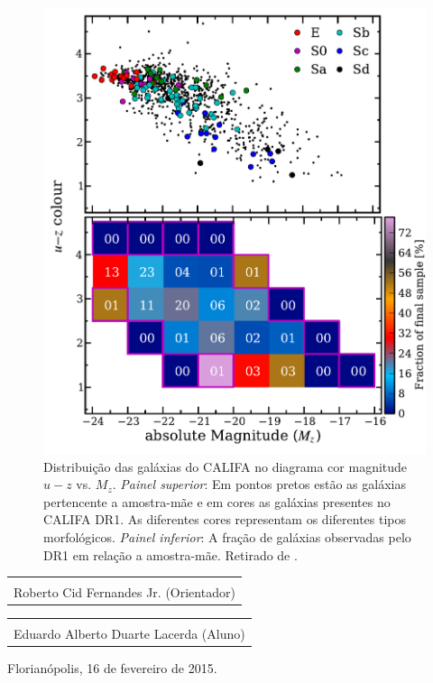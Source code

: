 \documentclass[a4paper,12pt]{article}
\makeatletter
\newcommand{\signature}[2][2.5in]{%
  \noindent%
  \begin{center}
  \begin{tabular}{@{}p{#1}@{}}
    \\ \hline \\ [-.75\normalbaselineskip]
    #2
  \end{tabular} 
  \end{center}
}
\makeatother
\begin{document}
\begin{figure}
	\begin{center}
    \includegraphics[height=0.5\textwidth]{figuras/figHusemann2013Fig2.pdf}
    \caption[Diagrama cor-magnitude para as galáxias do CALIFA.]
    {Distribui\c{c}\~ao das galáxias do CALIFA no diagrama cor magnitude $u-z$ vs. $M_z$. {\em
    Painel superior}: Em pontos pretos est\~ao as galáxias pertencente a amostra-m\~ae e em cores
    as galáxias presentes no CALIFA DR1. As diferentes cores representam os diferentes tipos
    morfológicos. {\em Painel inferior}: A fra\c{c}\~ao de galáxias observadas pelo DR1 em
    rela\c{c}\~ao a amostra-m\~ae. Retirado de \citet{Husemann.etal.2013a}.}
    \label{fig:cm-uzMz}
    \end{center}
\end{figure}




\vspace{2cm}

\signature[4in]{Roberto Cid Fernandes Jr. (Orientador)}

\vspace{2cm}

\signature[4in]{Eduardo Alberto Duarte Lacerda (Aluno)}

\vspace{4cm}

\begin{center}
Florianópolis, 16 de fevereiro de 2015.
\end{center}
\end{document}
